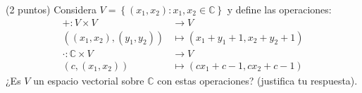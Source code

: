 \documentclass[11pt]{scrartcl}
\begin{document}
\begin{mdframed}[style=mdpurplebox, frametitle={Ejercicio 2, Tarea 05, Álgebra Lineal I}]
    (2 puntos) Considera $V=\left\{(x_1,x_2):x_1,x_2\in \mathbb{C}\right\}$ y define las operaciones:
    \begin{align*}
        +:V\times V &\rightarrow V \\
        \left((x_1,x_2),(y_1,y_2)\right) &\mapsto (x_1+y_1+1,x_2+y_2+1) \\
        \cdot : \mathbb{C} \times V &\rightarrow V \\
        \left(c,(x_1,x_2)\right) &\mapsto (cx_1+c-1, cx_2+c-1)
    \end{align*}
    ¿Es $V$ un espacio vectorial sobre $\mathbb{C}$ con estas operaciones? (justifica tu respuesta).
\end{mdframed}
\end{document}
